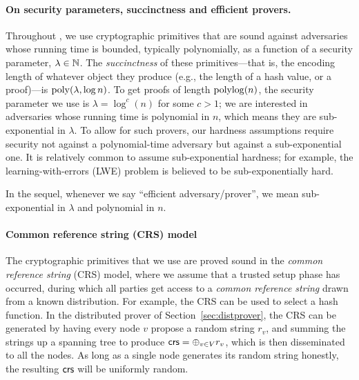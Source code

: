 \paragraph{On security parameters, succinctness and efficient provers.}
Throughout , we use cryptographic primitives
that are sound against adversaries whose running time is bounded, typically polynomially, as a function
of a security parameter, $\lambda \in \mathbb{N}$.
The \emph{succinctness} of these primitives---that is, the encoding length of whatever object they produce (e.g., the length of a hash value, or a proof)---is $\operatorname{poly}(\lambda, \log n)$.
To get proofs of length $\operatorname{polylog}(n)$, the security parameter we use is $\lambda = \log^c(n)$
for some $c > 1$;
we are interested in adversaries whose running time is polynomial in $n$,
which means they are sub-exponential in $\lambda$. %
To allow for such provers, our hardness assumptions require security not against a polynomial-time adversary
but against a sub-exponential one.
It is relatively common to assume sub-exponential hardness;
for example, the learning-with-errors (LWE) problem is believed to be sub-exponentially hard.

In the sequel, whenever we say ``efficient adversary/prover'',
we mean sub-exponential in $\lambda$ and polynomial in $n$.

\paragraph{Common reference string (CRS) model}
The cryptographic primitives that we use are proved sound in the \emph{common reference string} (CRS) model,
where we assume that a trusted setup phase has occurred, during which all parties get access to
a \emph{common reference string} drawn from a known distribution.
For example, the CRS can be used to select a hash function.
In the distributed prover of Section~\ref{sec:distprover},
the CRS can be generated by having every node $v$ propose a random string $r_v$,
and summing the strings up a spanning tree to produce $\mathsf{crs} = \oplus_{v \in V} r_v$,
which is then disseminated to all the nodes. As long as a single node generates its random string honestly, the resulting $\mathsf{crs}$
will be uniformly random.

